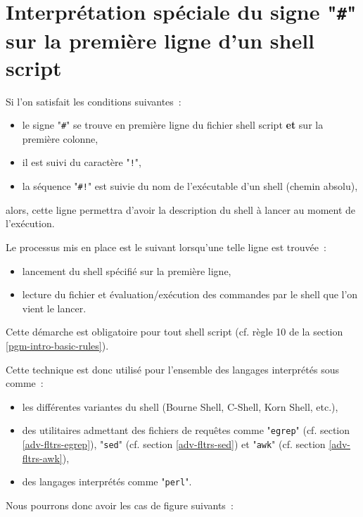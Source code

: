 \section{Interpr{\'e}tation sp{\'e}ciale du signe "\texttt{\#}" sur la premi{\`e}re ligne d'un shell script}

Si l'on satisfait les conditions suivantes~:
\begin{itemize}
	\item	le signe "\verb=#=" se trouve en premi{\`e}re ligne du fichier shell script {\bf et}
			sur la premi{\`e}re colonne,
	\item	il est suivi du caract{\`e}re "\verb=!=",
	\item	la s{\'e}quence "\verb=#!=" est suivie du nom de l'ex{\'e}cutable d'un shell (chemin absolu),
\end{itemize}

alors, cette ligne permettra d'avoir la description du shell {\`a} lancer au moment de l'ex{\'e}cution.

Le processus mis en place est le suivant lorsqu'une telle ligne est trouv{\'e}e~:
\begin{itemize}
	\item	lancement du shell sp{\'e}cifi{\'e} sur la premi{\`e}re ligne,
	\item	lecture du fichier et {\'e}valuation/ex{\'e}cution des commandes par le shell que l'on 
			vient le lancer.
\end{itemize}

Cette d{\'e}marche est obligatoire pour tout shell script (cf. r{\`e}gle 10 de la section \ref{pgm-intro-basic-rules}).

Cette technique est donc utilis{\'e} pour l'ensemble des langages interpr{\'e}t{\'e}s sous {\Unix} comme~:
\begin{itemize}
	\item	les diff{\'e}rentes variantes du shell (Bourne Shell, C-Shell, Korn Shell, etc.),
	\item	des utilitaires admettant des fichiers de requ{\^e}tes comme "\texttt{egrep}" (cf. section \ref{adv-fltrs-egrep}),
			"\texttt{sed}" (cf. section \ref{adv-fltrs-sed}) et "\texttt{awk}" (cf. section \ref{adv-fltrs-awk}), 
	\item	des langages interpr{\'e}t{\'e}s comme "\texttt{perl}"\cite{learning-perl,programming-perl,advpgm-perl}.
\end{itemize}

Nous pourrons donc avoir les cas de figure suivants~:

